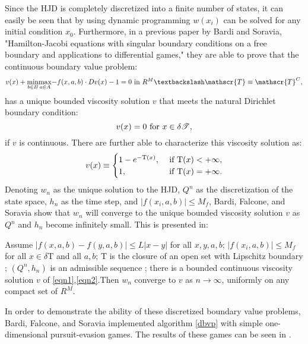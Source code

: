 Since the HJD is completely discretized into a finite number of states, it can easily be seen that by using dynamic programming $w(x_i)$ can be solved for any initial condition $x_0$. Furthermore, in a previous paper by Bardi and Soravia, "Hamilton-Jacobi equations with singular boundary conditions on a free boundary and applications to differential games,"\cite{bardi1} they are able to prove that the continuous boundary value problem:
\begin{equation}\label{eqn1}
v(x) + \underset{b \in B }{\operatorname{min }}\underset{a \in A}{\operatorname{max}}{-f(x,a,b)\cdot Dv(x)-1}=0 \textnormal{ in } R^M\textbackslash \mathscr{T} \equiv \mathscr{T}^C,
\end{equation}
has a unique bounded viscosity solution $v$ that meets the natural Dirichlet boundary condition:
\begin{equation}\label{eqn2}
v(x) = 0 \textnormal{ for } x \in \delta \mathscr{T},
\end{equation}
if $v$ is continuous. There are further able to characterize this viscosity solution as:
\begin{equation}\label{eqn3}
v(x) \equiv 
\begin{cases}
1-e^{-\textnormal{T}(x)}, & \textnormal{ if T}(x) < + \infty,\\
1, & \textnormal{ if T}(x) = + \infty.
\end{cases}
\end{equation}
Denoting $w_n$ as the unique solution to the HJD, $Q^n$ as the discretization of the state space, $h_n$ as the time step, and $|f(x_i,a,b)| \leq M_f$, Bardi, Falcone, and Soravia show that $w_n$ will converge to the unique bounded viscosity solution $v$ as $Q^n$ and $h_n$ become infinitely small. This is presented in: 
\begin{theorem}\label{dbvpt}
Assume $|f(x,a,b)-f(y,a,b)| \leq L|x-y|$ for all $x,y,a,b$; $|f(x_i,a,b)| \leq M_f$ for all $x \in \delta$T and all $a,b$; T is the closure of an open set with Lipschitz boundary ; $(Q^n,h_n)$ is an admissible sequence ; there is a bounded continuous viscosity solution $v$ of \ref{eqn1},\ref{eqn2}.Then $w_n$ converge to $v$ as $n \rightarrow \infty$, uniformly on any compact set of $R^M$.   
\end{theorem}
In order to demonstrate the ability of these discretized boundary value problems, Bardi, Falcone, and Soravia implemented algorithm \ref{dbvp} with simple one-dimensional pursuit-evasion games. The results of these games can be seen in .\cite{bardi2}
